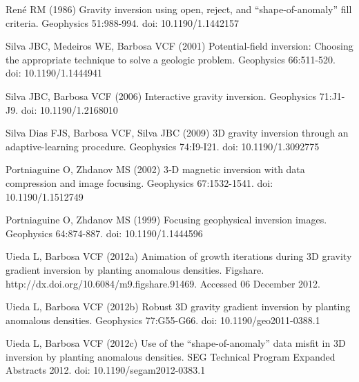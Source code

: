 \documentclass[twocolumn,final]{svjour3}
\begin{document}
\begin{thebibliography}{}
Ren\'e RM (1986)
Gravity inversion using open, reject, and ``shape-of-anomaly'' fill criteria.
Geophysics 51:988-994. doi: 10.1190/1.1442157

Silva JBC, Medeiros WE, Barbosa VCF (2001)
Potential-field inversion: Choosing the appropriate technique to solve a
geologic problem. Geophysics 66:511-520. doi: 10.1190/1.1444941

Silva JBC, Barbosa VCF (2006)
Interactive gravity inversion. Geophysics 71:J1-J9. doi: 10.1190/1.2168010

Silva Dias FJS, Barbosa VCF, Silva JBC (2009)
3D gravity inversion through an adaptive-learning procedure.
Geophysics 74:I9-I21. doi: 10.1190/1.3092775

Portniaguine O, Zhdanov MS (2002)
3‐D magnetic inversion with data compression and image focusing.
Geophysics 67:1532-1541. doi: 10.1190/1.1512749

Portniaguine O, Zhdanov MS (1999)
Focusing geophysical inversion images. Geophysics 64:874-887.
doi: 10.1190/1.1444596

Uieda L, Barbosa VCF (2012a)
Animation of growth iterations during 3D gravity gradient inversion by planting
anomalous densities. Figshare. http://dx.doi.org/10.6084/m9.figshare.91469.
Accessed 06 December 2012.

Uieda L, Barbosa VCF (2012b)
Robust 3D gravity gradient inversion by planting anomalous densities.
Geophysics 77:G55-G66. doi: 10.1190/geo2011-0388.1

Uieda L, Barbosa VCF (2012c)
Use of the ``shape-of-anomaly'' data misfit in 3D inversion by planting
anomalous densities. SEG Technical Program Expanded Abstracts 2012.
doi: 10.1190/segam2012-0383.1

\end{thebibliography}
\end{document}
